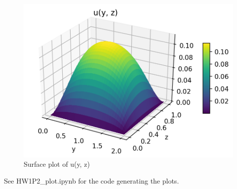 \begin{solution} 

\begin{figure}[H]
\includegraphics[scale=1]{surface_plot}
\centering
\caption{Surface plot of u(y, z)}
\label{fig:surf}
\end{figure}

See HW1P2\_plot.ipynb for the code generating the plots.

\end{solution} 